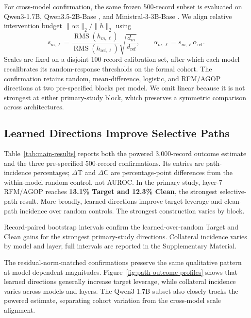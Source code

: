 For cross-model confirmation, the same frozen 500-record subset is evaluated
on Qwen3-1.7B, Qwen3.5-2B-Base \citep{qwen2026qwen35}, and
Ministral-3-3B-Base \citep{liu2026ministral3}. We align relative
intervention budget $\|\alpha v\|_2/\|h\|_2$ using
\begin{equation}
    s_{m,\ell}=\frac{\operatorname{RMS}(h_{m,\ell})}
    {\operatorname{RMS}(h_{\mathrm{ref},\ell})}
    \sqrt{\frac{d_m}{d_{\mathrm{ref}}}},
    \qquad \alpha_{m,\ell}=s_{m,\ell}\alpha_{\mathrm{ref}}.
    \label{eq:rms-matching}
\end{equation}
Scales are fixed on a disjoint 100-record calibration set, after which each
model recalibrates its random-response thresholds on the formal cohort. The
confirmation retains random, mean-difference, logistic, and RFM/AGOP directions
at two pre-specified blocks per model. We omit linear because it is not strongest
at either primary-study block, which preserves a symmetric comparison across
architectures.




\subsection{Learned Directions Improve Selective Paths}

Table~\ref{tab:main-results} reports both the powered 3,000-record outcome
estimate and the three pre-specified 500-record confirmations. Its entries are
path-incidence percentages; $\Delta$T and $\Delta$C are percentage-point
differences from the within-model random control, not AUROC. In the primary
study, layer-7 RFM/AGOP reaches \textbf{13.1\% Target and 12.3\% Clean}, the
strongest selective-path result. More broadly, learned directions improve
target leverage and clean-path incidence over random controls. The strongest
construction varies by block.

Record-paired bootstrap intervals confirm the learned-over-random Target and
Clean gains for the strongest primary-study directions. Collateral incidence
varies by model and layer; full intervals are reported in the Supplementary
Material.

The residual-norm-matched confirmations preserve the same qualitative pattern
at model-dependent magnitudes. Figure~\ref{fig:path-outcome-profiles} shows
that learned directions generally increase target leverage, while collateral
incidence varies across models and layers. The Qwen3-1.7B subset also closely
tracks the powered estimate, separating cohort variation from the cross-model
scale alignment.

